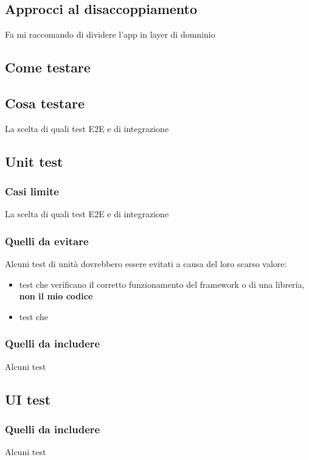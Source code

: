 \subsection{Approcci al disaccoppiamento}
Fa mi raccomando di dividere l'app in layer di domninio


\subsection{Come testare}

\subsection{Cosa testare}
\par La scelta di quali test E2E e di integrazione 

\subsection{Unit test}
\subsubsection{Casi limite}
\par La scelta di quali test E2E e di integrazione 

\subsubsection{Quelli da evitare}
\par Alcuni test di unità dovrebbero essere evitati a causa del loro scarso valore:
\begin{itemize}
    \item test che verificano il corretto funzionamento del framework o di una libreria, \textbf{non il mio codice}
    \item test che 
\end{itemize}

\subsubsection{Quelli da includere}
\par Alcuni test 

\subsection{UI test}
\subsubsection{Quelli da includere}
\par Alcuni test 

